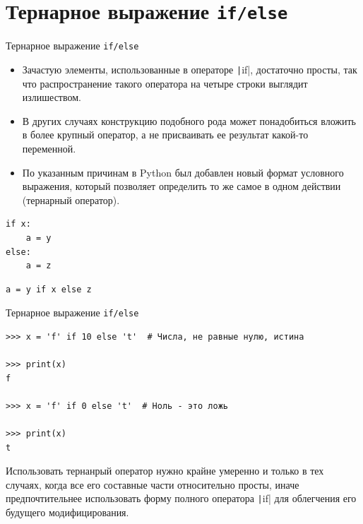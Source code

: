 \documentclass[aspectratio=169, mathserif]{beamer}	%
\begin{document}
\section{Тернарное выражение \texttt{if/else}}
\sectionframe


\begin{frame}[fragile]{Тернарное выражение \texttt{if/else}}
\scriptsize
\begin{itemize}
	\item Зачастую элементы, использованные в операторе \texttt|if|, достаточно просты, так что распространение такого оператора на четыре строки выглядит излишеством.
	
	\item В других случаях конструкцию подобного рода может понадобиться вложить в более крупный оператор, а не присваивать ее результат какой-то переменной.
	
	\item По указанным причинам в Python был добавлен новый формат условного выражения, который позволяет определить то же самое в одном действии (тернарный оператор).
\end{itemize}

\begin{multicols}{2}

\begin{verbatim}
if x:
    a = y
else:
    a = z
\end{verbatim}

\columnbreak

\begin{verbatim}
a = y if x else z
\end{verbatim}
\end{multicols}
\vfill
\end{frame}


\begin{frame}[fragile]{Тернарное выражение \texttt{if/else}}
\scriptsize
\begin{verbatim}
>>> x = 'f' if 10 else 't'  # Числа, не равные нулю, истина

>>> print(x)
f

>>> x = 'f' if 0 else 't'  # Ноль - это ложь

>>> print(x)
t
\end{verbatim}
Использовать тернанрый оператор нужно крайне умеренно и только в тех случаях, когда все его составные части относительно просты, иначе предпочтительнее использовать форму полного оператора \texttt|if| для облегчения его  будущего модифицирования.
\vfill
\end{frame}
\end{document}
